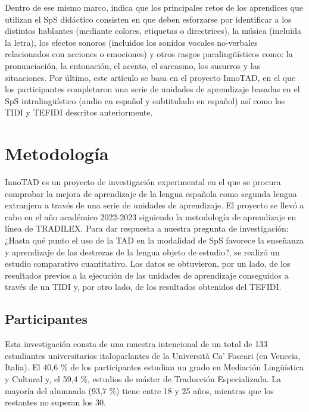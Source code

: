 \documentclass[spanish]{textolivre}
\begin{document}
Dentro de ese mismo marco, \textcite{zarate2021} indica que los principales retos de los aprendices que utilizan el SpS didáctico consisten en que deben esforzarse por identificar a los distintos hablantes (mediante colores, etiquetas o directrices), la música (incluida la letra), los efectos sonoros (incluidos los sonidos vocales no-verbales relacionados con acciones o emociones) y otros rasgos paralingüísticos como: la pronunciación, la entonación, el acento, el sarcasmo, los susurros y las situaciones. Por último, este artículo se basa en el proyecto InnoTAD, en el que los participantes completaron una serie de unidades de aprendizaje basadas en el SpS intralingüístico (audio en español y subtitulado en español) así como los TIDI y TEFIDI descritos anteriormente.

\section{Metodología}\label{sec-3}
InnoTAD es un proyecto de investigación experimental en el que se procura comprobar la mejora de aprendizaje de la lengua española como segunda lengua extranjera a través de una serie de unidades de aprendizaje. El proyecto se llevó a cabo en el año académico 2022-2023 siguiendo la metodología de aprendizaje en línea de TRADILEX. Para dar respuesta a nuestra pregunta de investigación: ¿Hasta qué punto el uso de la TAD en la modalidad de SpS favorece la enseñanza y aprendizaje de las destrezas de la lengua objeto de estudio?, se realizó un estudio comparativo cuantitativo. Los datos se obtuvieron, por un lado, de los resultados previos a la ejecución de las unidades de aprendizaje conseguidos a través de un TIDI y, por otro lado, de los resultados obtenidos del TEFIDI.

\subsection{Participantes}\label{sec-3.1}
Esta investigación consta de una muestra intencional de un total de 133 estudiantes universitarios italoparlantes de la Università Ca’ Foscari (en Venecia, Italia). El 40,6 \% de los participantes estudian un grado en Mediación Lingüística y Cultural y, el 59,4 \%, estudios de máster de Traducción Especializada. La mayoría del alumnado (93,7 \%) tiene entre 18 y 25 años, mientras que los restantes no superan los 30. 
\end{document}
